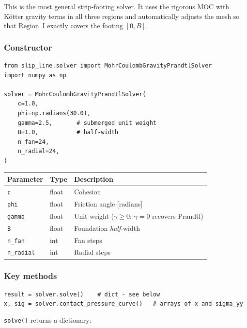 \documentclass[11pt,a4paper]{article}
\begin{document}
This is the most general strip-footing solver.  It uses the rigorous
MOC with Kötter gravity terms in all three regions and automatically
adjusts the mesh so that Region~I exactly covers the footing $[0,B]$.

\subsubsection*{Constructor}

\begin{lstlisting}
from slip_line.solver import MohrCoulombGravityPrandtlSolver
import numpy as np

solver = MohrCoulombGravityPrandtlSolver(
    c=1.0,
    phi=np.radians(30.0),
    gamma=2.5,       # submerged unit weight
    B=1.0,           # half-width
    n_fan=24,
    n_radial=24,
)
\end{lstlisting}

\begin{center}
\begin{tabular}{lll}
\toprule
Parameter & Type & Description \\
\midrule
\texttt{c}       & float & Cohesion \\
\texttt{phi}     & float & Friction angle [radians] \\
\texttt{gamma}   & float & Unit weight ($\gamma \geq 0$; $\gamma=0$ recovers Prandtl) \\
\texttt{B}       & float & Foundation \emph{half}-width \\
\texttt{n\_fan}    & int & Fan steps \\
\texttt{n\_radial} & int & Radial steps \\
\bottomrule
\end{tabular}
\end{center}

\subsubsection*{Key methods}

\begin{lstlisting}
result = solver.solve()    # dict - see below
x, sig = solver.contact_pressure_curve()   # arrays of x and sigma_yy
\end{lstlisting}

\texttt{solve()} returns a dictionary:
\end{document}
